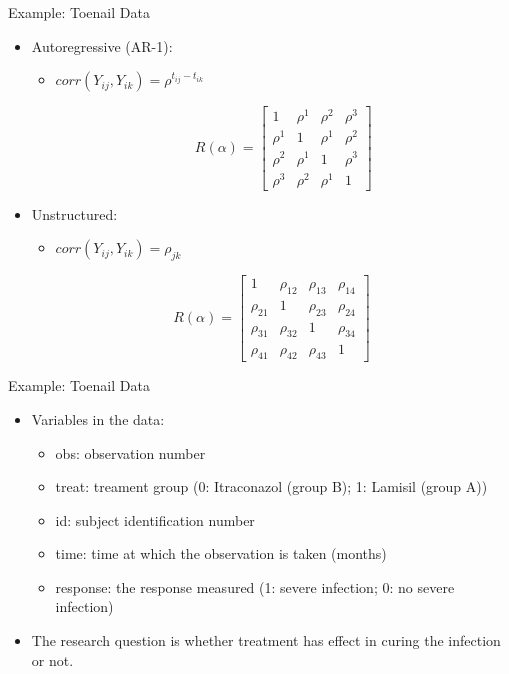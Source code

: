 \documentclass{beamer}
\begin{document}
\begin{frame}{Example: Toenail Data}
\begin{itemize}
	   \item Autoregressive (AR-1): 
	\begin{itemize}
		\item $corr(Y_{ij}, Y_{ik})=\rho^{t_{ij}-t_{ik}}$
 
	\[R(\alpha)=\left[ \begin{array}{ccccc}
	1 & \rho^{1} & \rho^{2}& \rho^{3}\\
	\rho^{1} & 1 & \rho^{1} & \rho^{2}\\
	\rho^{2} & \rho^{1} & 1 & \rho^{3}\\
	\rho^{3}& \rho^{2} & \rho^{1} & 1
	\end{array} \right]\]
\end{itemize}
    	\item Unstructured: 
	\begin{itemize}
		\item $corr(Y_{ij}, Y_{ik})=\rho_{jk}$ 
	\end{itemize}
 \[R(\alpha)=\left[ \begin{array}{ccccc}
1 & \rho_{12} & \rho_{13} & \rho_{14}\\
\rho_{21} & 1 & \rho_{23} & \rho_{24}\\
\rho_{31} & \rho_{32} & 1 & \rho_{34}\\
\rho_{41}& \rho_{42} & \rho_{43} & 1
\end{array} \right]\]	

\end{itemize}	
\end{frame}


\begin{frame}{Example: Toenail Data}
\begin{itemize}
	\item Variables in the data:
	\begin{itemize}
		\item obs: observation number
		\item treat: treament group (0: Itraconazol (group B); 1: Lamisil (group A))
		\item id: subject identification number
		\item time: time at which the observation is taken (months)
		\item response: the response measured (1: severe infection; 0: no severe infection)
	\end{itemize}
\item The research question is {\color{red}whether treatment has effect in curing the infection or not.}
\end{itemize}
\end{frame}
\end{document}
